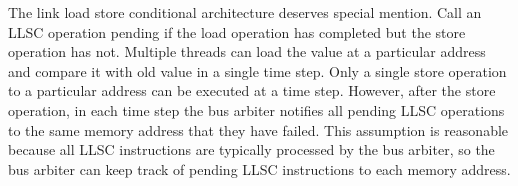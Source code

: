 \documentclass[preprint]{sigplanconf}
\begin{document}
The link load store conditional architecture deserves special mention. Call an LLSC operation pending if the load operation has completed but the store operation has not. Multiple threads can load the value at a particular address and compare it with old value in a single time step. Only a single store operation to a particular address can be executed at a time step. However, after the store operation, in each time step the bus arbiter notifies all pending LLSC operations to the same memory address that they have failed. This assumption is reasonable because all LLSC instructions are typically processed by the bus arbiter, so the bus arbiter can keep track of pending LLSC instructions to each memory address.







\end{document}
